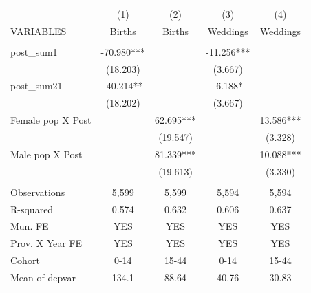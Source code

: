 \begin{tabular}{lcccc} \hline
 & (1) & (2) & (3) & (4) \\
VARIABLES & Births & Births & Weddings & Weddings \\ \hline
 &  &  &  &  \\
post\_sum1 & -70.980*** &  & -11.256*** &  \\
 & (18.203) &  & (3.667) &  \\
post\_sum21 & -40.214** &  & -6.188* &  \\
 & (18.202) &  & (3.667) &  \\
Female pop X Post &  & 62.695*** &  & 13.586*** \\
 &  & (19.547) &  & (3.328) \\
Male pop X Post &  & 81.339*** &  & 10.088*** \\
 &  & (19.613) &  & (3.330) \\
 &  &  &  &  \\
Observations & 5,599 & 5,599 & 5,594 & 5,594 \\
R-squared & 0.574 & 0.632 & 0.606 & 0.637 \\
Mun. FE & YES & YES & YES & YES \\
Prov. X Year FE & YES & YES & YES & YES \\
Cohort & 0-14 & 15-44 & 0-14 & 15-44 \\
 Mean of depvar & 134.1 & 88.64 & 40.76 & 30.83 \\ \hline
\end{tabular}
